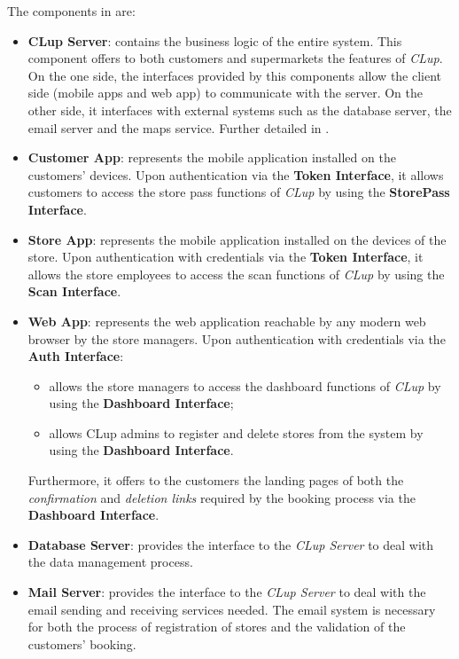 The components in  are:
\begin{itemize}
	\item \textbf{CLup Server}: contains the business logic of the entire system. This component offers to both customers and supermarkets the features of \textit{CLup}. On the one side, the interfaces provided by this components allow the client side (mobile apps and web app) to communicate with the server. On the other side, it interfaces with external systems such as the database server, the email server and the maps service. Further detailed in .
	
	\item \textbf{Customer App}: represents the mobile application installed on the customers' devices. Upon authentication via the \textbf{Token Interface}, it allows customers to access the store pass functions of \textit{CLup} by using the \textbf{StorePass Interface}.
	
	\item \textbf{Store App}: represents the mobile application	installed on the devices of the store. Upon authentication with credentials via the \textbf{Token Interface}, it allows the store employees to access the scan functions of \textit{CLup} by using the \textbf{Scan Interface}.
	
	\item \textbf{Web App}: represents the web application reachable by any modern web browser by the store managers. Upon authentication with credentials via the \textbf{Auth Interface}:
	\begin{itemize}
		\item allows the store managers to access the dashboard functions of \textit{CLup} by using the \textbf{Dashboard Interface};
		\item allows CLup admins to register and delete stores from the system by using the \textbf{Dashboard Interface}.
	\end{itemize}
	Furthermore, it offers to the customers the landing pages of both the \textit{confirmation} and \textit{deletion links} required by the booking process via the \textbf{Dashboard Interface}.
	
	\item \textbf{Database Server}:	provides the interface to the \textit{CLup Server} to deal with the data management process. 
	
	\item \textbf{Mail Server}: provides the interface to the \textit{CLup Server} to deal with the email sending and receiving services needed. The email system is necessary for both the process of registration of stores and the validation of the customers' booking.
	

\end{itemize}
